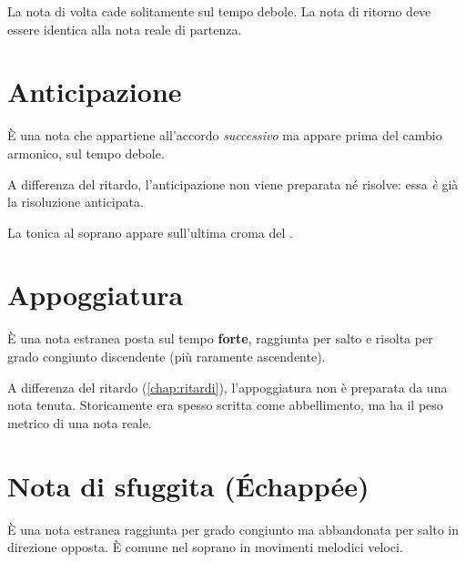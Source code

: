 \begin{regola}
    La nota di volta cade solitamente sul tempo debole. La nota di ritorno deve essere identica alla nota reale di partenza.
\end{regola}

\section{Anticipazione}
\label{sec:anticipazione}

\begin{definizione}[Anticipazione]
    È una nota che appartiene all'accordo \textit{successivo} ma appare prima del cambio armonico, sul tempo debole.
\end{definizione}

\begin{regola}
    A differenza del ritardo, l'anticipazione non viene preparata né risolve: essa \textit{è} già la risoluzione anticipata.
\end{regola}

\begin{esempio}
    La tonica al soprano appare sull'ultima croma del .
\end{esempio}

\section{Appoggiatura}
\label{sec:appoggiatura}

\begin{definizione}[Appoggiatura]
    È una nota estranea posta sul tempo \textbf{forte}, raggiunta per salto e risolta per grado congiunto discendente (più raramente ascendente).
\end{definizione}

\begin{regola}
    A differenza del ritardo (\ref{chap:ritardi}), l'appoggiatura non è preparata da una nota tenuta. Storicamente era spesso scritta come abbellimento, ma ha il peso metrico di una nota reale.
\end{regola}

\section{Nota di sfuggita (Échappée)}
\label{sec:sfuggita}

\begin{definizione}
    È una nota estranea raggiunta per grado congiunto ma abbandonata per salto in direzione opposta. È comune nel soprano in movimenti melodici veloci.
\end{definizione}

